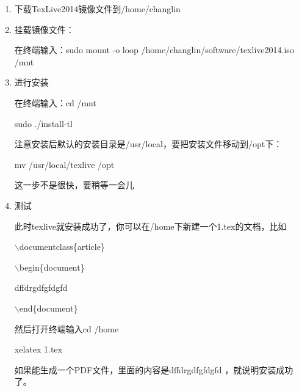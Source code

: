 \documentclass[12pt]{article}
\begin{document}
\begin{enumerate}
\item 下载TexLive2014镜像文件到/home/changlin
\item 挂载镜像文件：

在终端输入：sudo mount -o loop /home/changlin/software/texlive2014.iso /mnt
\item 进行安装

在终端输入：cd /mnt

           sudo ./install-tl

注意安装后默认的安装目录是/usr/local，要把安装文件移动到/opt下：

mv /usr/local/texlive /opt

这一步不是很快，要稍等一会儿

\begin{comment}
\item 配置环境变量：
  
  \begin{enumerate}
   \item 打开终端，输入：sudo vim ~/.profile 　

         在最后添加以下代码：

        PATH=/opt/texlive/2014/bin/x86\_64-linux:\$PATH; export PATH
        MANPATH=/opt/texlive/2014/texmf-dist/doc/man:\$MANPATH; export MANPATH

        INFOPATH=/opt/texlive/2014/texmf-dist/doc/info:\$INFOPATH; export INFOPATH

   \item 然后sudo vim /etc/manpath.config
　　 在\# set up PATH to MANPATH mapping下输入

        MANPATH\_MAP /opt/texlive/2014/bin/x86\_64-linux （空格）/opt/texlive/2013/texmf-dist/doc/man
  
  \end{enumerate}

\end{comment}
\item 测试

此时texlive就安装成功了，你可以在/home下新建一个1.tex的文档，比如

$\backslash$documentclass\{article\}

$\backslash$begin\{document\}

dffdrgdfgfdgfd

$\backslash$end\{document\}

然后打开终端输入cd /home

               xelatex 1.tex

如果能生成一个PDF文件，里面的内容是dffdrgdfgfdgfd ，就说明安装成功了。

\end{enumerate}
\end{document}
